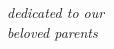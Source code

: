 
\begin{titlepage}
\begin{center}

    \thispagestyle{empty}
    \vspace*{\fill}
    
    \textit{dedicated to our \\
    \vspace{0.1cm}
    beloved parents
    }
      

    \vspace*{\fill}
\end{center}
\end{titlepage}